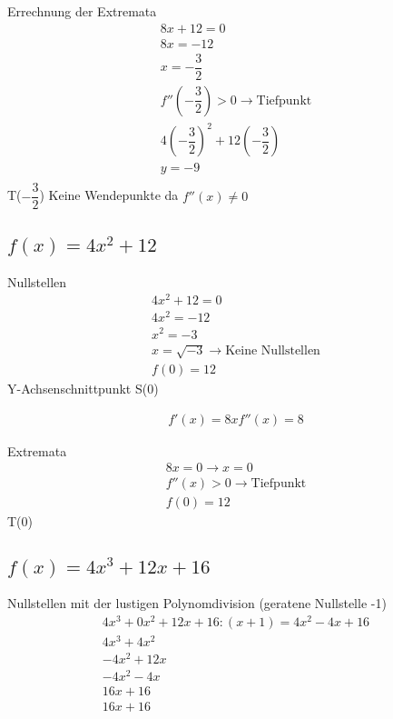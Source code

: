 \documentclass[11pt,a4paper]{article}
\begin{document}
Errechnung der Extremata
\begin{eqnarray}
8x + 12 = 0\\
8x = -12\\
x = -\dfrac{3}{2}\\
f''(-\dfrac{3}{2}) > 0 \rightarrow \text{Tiefpunkt}\\
4(-\dfrac{3}{2})^2 + 12(-\dfrac{3}{2})\\
y = -9\\
\end{eqnarray}
T($-\dfrac{3}{2}$)
\newline
Keine Wendepunkte da $f''(x) \neq 0$
\newpage

\subsection{$f(x) = 4x^2 + 12$}
Nullstellen
\begin{eqnarray}
4x^2 + 12 = 0\\
4x^2 = -12\\
x^2 = -3\\
x = \sqrt{-3} \rightarrow \text{Keine Nullstellen}\\
f(0) = 12
\end{eqnarray}
Y-Achsenschnittpunkt S(0)

\begin{eqnarray}
f'(x) = 8x
f''(x) = 8
\end{eqnarray}

Extremata
\begin{eqnarray}
8x = 0 \rightarrow x = 0\\
f''(x) > 0 \rightarrow \text{Tiefpunkt}\\
f(0) = 12
\end{eqnarray}
T(0)
\newpage

\subsection{$f(x) = 4x^3 + 12x + 16$}

Nullstellen mit der lustigen Polynomdivision (geratene Nullstelle -1)
\begin{eqnarray}
4x^3 + 0x^2 + 12x + 16 : (x + 1) = 4x^2 - 4x + 16\\
4x^3 + 4x^2\qquad \qquad \qquad \qquad\qquad\qquad\qquad\qquad \\
-4x^2 + 12x \qquad \qquad\qquad\qquad\qquad\qquad\qquad\\
-4x^2 - 4x \qquad \qquad\qquad\qquad\qquad\qquad\qquad\\
16x + 16\qquad\qquad\qquad\qquad\qquad\qquad\\
16x + 16\qquad\qquad\qquad\qquad\qquad\qquad
\end{eqnarray}
\end{document}
